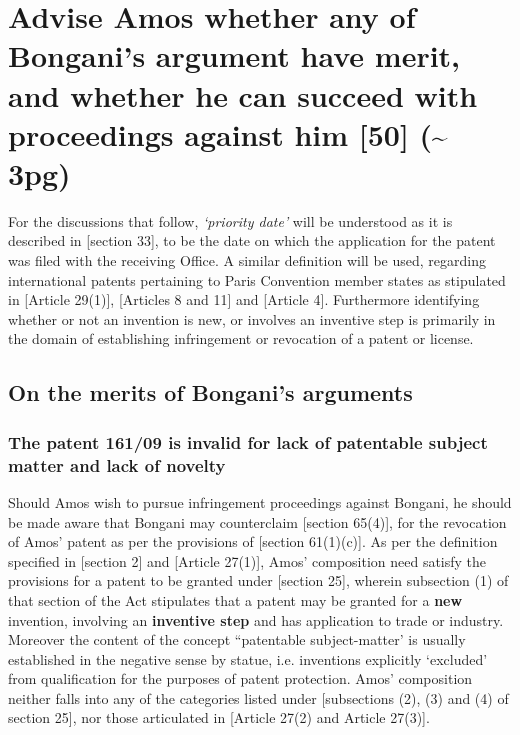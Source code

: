 \documentclass[11pt]{article}
\begin{document}
\section{Advise Amos whether any of Bongani's argument have merit, and whether he can succeed with proceedings against him [50] (\textasciitilde{} 3pg)}
\label{sec:org4ad055a}
For the discussions that follow, \emph{`priority date'} will be understood as it is described in [section 33]\cite{rsa78_patents_act}, to
be the date on which the application for the patent was filed with the receiving Office. A similar definition will be used,
regarding international patents pertaining to Paris Convention member states as stipulated in [Article 29(1)]\cite{wto17_trips},
[Articles 8 and 11]\cite{wipo70_pct} and [Article 4]\cite{wipo83_paris_conve_protect_ip}. Furthermore identifying whether or not an
invention is new, or involves an inventive step is primarily in the domain of establishing infringement or revocation of a patent
or license.\\

\subsection{On the merits of Bongani's arguments}
\label{sec:org2b15c50}
\subsubsection{The patent 161/09 is invalid for lack of patentable subject matter and lack of novelty}
\label{sec:orgdec9f94}
Should Amos wish to pursue infringement proceedings against Bongani, he should be made aware that Bongani may counterclaim
[section 65(4)]\cite{rsa78_patents_act}, for the revocation of Amos' patent as per the provisions of [section
61(1)(c)]\cite{rsa78_patents_act}. As per the definition specified in [section 2]\cite{rsa78_patents_act} and [Article
27(1)]\cite{wto17_trips}, Amos' composition need satisfy the provisions for a patent to be granted under [section
25]\cite{rsa78_patents_act}, wherein subsection (1) of that section of the Act stipulates that a patent may be granted for a \textbf{new}
invention, involving an \textbf{inventive step} and has application to trade or industry. Moreover the content of the concept
``patentable subject-matter' is usually established in the negative sense by statue, i.e. inventions explicitly `excluded' from
qualification for the purposes of patent protection. Amos' composition neither falls into any of the categories listed under
[subsections (2), (3) and (4) of section 25]\cite{rsa78_patents_act}, nor those articulated in [Article 27(2) and Article
27(3)]\cite{wto17_trips}.\\
\end{document}
